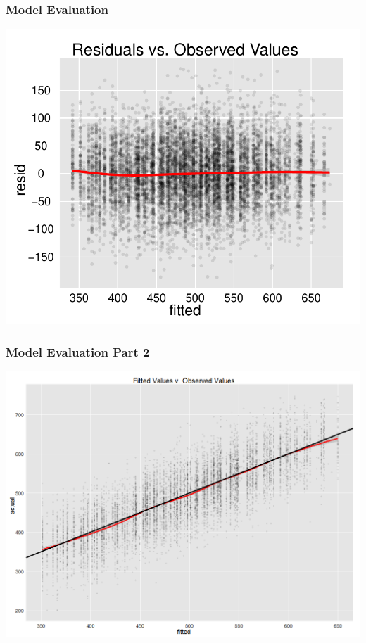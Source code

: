 \documentclass{beamer}
\begin{document}
\begin{frame}
\frametitle{Model Evaluation}
\begin{center}
\vspace{-.1in}
\includegraphics[width=.8\textwidth]{residplot}
\end{center}
\end{frame}

\begin{frame}
\frametitle{Model Evaluation Part 2}
\vspace{-.1in}
\begin{center}
\includegraphics[width=.8\textwidth]{fittedplot}
\end{center}
\end{frame}
\end{document}

